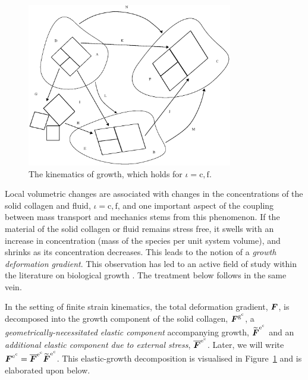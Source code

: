\begin{figure}[ht]
  \centering
  \includegraphics[width=0.8\textwidth]{images/elucidation/kinematics}
  \caption{The kinematics of growth, which holds for $\iota =
    \mathrm{c,f}$.} 
  \label{continuum-potato-growth-kinematics}
\end{figure}

Local volumetric changes are associated with changes in the
concentrations of the solid collagen and fluid, $\iota =
\mathrm{c,f}$, and one important aspect of the coupling between mass
transport and mechanics stems from this phenomenon.  If the material
of the solid collagen or fluid remains stress free, it swells with an
increase in concentration (mass of the species per unit system
volume), and shrinks as its concentration decreases. This leads to the
notion of a \emph{growth deformation gradient}.  This observation has
led to an active field of study within the literature on biological
growth \citep{Skalak:81, SkalakHoger:96, Klischetal:2001,
  TaberHumphrey:2001, LubardaHoger:02, AmbrosiMollica:2002}. The
treatment below follows in the same vein.

In the setting of finite strain kinematics, the total deformation
gradient, $\mbox{\boldmath$ F$}$, is decomposed into the growth component of the solid
collagen, $\mbox{\boldmath$ F$}^{\mathrm{g}^\mathrm{c}}$, a
\emph{geometrically-necessitated elastic component} accompanying
growth, $\widetilde{\mbox{\boldmath$ F$}}^{\mathrm{e}^\mathrm{c}}$ and an
\emph{additional elastic component due to external stress},
$\overline{\mbox{\boldmath$ F$}}^{\mathrm{e}^\mathrm{c}}$. Later, we will write
$\mbox{\boldmath$ F$}^{\mathrm{e}^\mathrm{c}} = \overline{\mbox{\boldmath$ F$}}^{\mathrm{e}^\mathrm{c}}
\widetilde{\mbox{\boldmath$ F$}}^{\mathrm{e}^\mathrm{c}}$. This elastic-growth
decomposition is visualised in
Figure~\ref{continuum-potato-growth-kinematics} and is elaborated upon
below.

